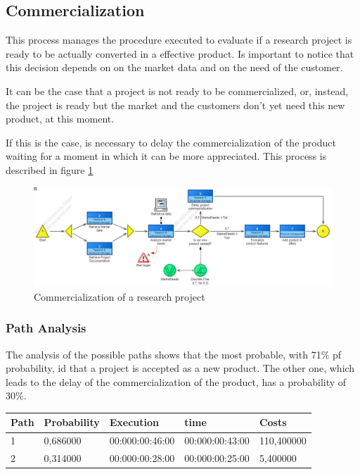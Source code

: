 



\subsection{Commercialization}
This process manages the procedure executed to evaluate if a research
project is ready to be actually converted in a effective product.
Is important to notice that this decision depends on on the market data and
on the need of the customer.

It can be the case that a project is not ready to be commercialized, or,
instead, the project is ready but the market and the customers don't yet
need this new product, at this moment.

If this is the case, is necessary to delay the commercialization of the
product waiting for a moment in which it can be more appreciated.
This process is described in figure \ref{2img:commerce}

\begin{figure}[!ht]
\begin{centering}
\includegraphics[scale=0.45,angle=90]{assign2/adonis/imgs/commercialize.jpg}
\caption{Commercialization of a research project}
\label{2img:commerce}
\end{centering}
\end{figure}

\subsubsection{Path Analysis}
The analysis of the possible paths shows that the most probable, with 71\%
pf probability, id that a project is accepted as a new product.
The other one, which leads to the delay of the commercialization of the
product, has a probability of 30\%.

\begin{table}[ht!]
\centering
\begin{tabular}{|l|l|l|l|l|}
Path&Probability&Execution&time&Costs\\
\hline
1&0,686000&00:000:00:46:00&00:000:00:43:00&110,400000\\
\hline
2&0,314000&00:000:00:28:00&00:000:00:25:00&5,400000\\
\hline
\end{tabular}
\end{table}


